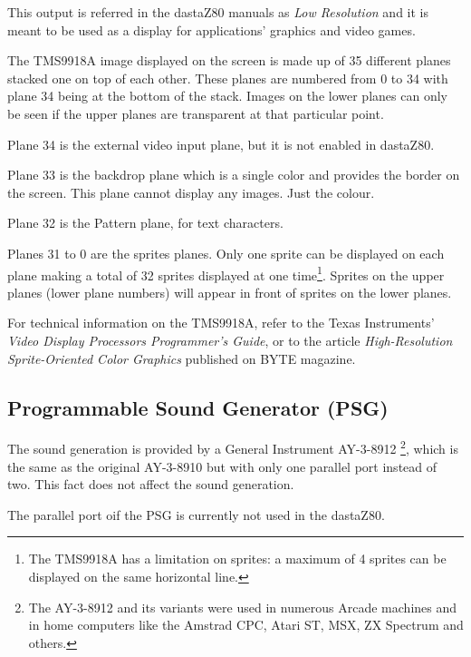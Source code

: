 \documentclass[a4paper,11pt]{article}
\begin{document}
    This output is referred in the dastaZ80 manuals as \textit{Low Resolution}
    and it is meant to be used as a display for applications' graphics and video
    games.

    The TMS9918A image displayed on the screen is made up of 35 different planes
    stacked one on top of each other. These planes are numbered from 0 to 34
    with plane 34 being at the bottom of the stack. Images on the lower planes
    can only be seen if the upper planes are transparent at that particular
    point.

    Plane 34 is the external video input plane, but it is not enabled in dastaZ80.

    Plane 33 is the backdrop plane which is a single color and provides the
    border on the screen. This plane cannot display any images. Just the colour.

    Plane 32 is the Pattern plane, for text characters.

    Planes 31 to 0 are the sprites planes. Only one sprite can be displayed on
    each plane making a total of 32 sprites displayed at one time\footnote{The 
    TMS9918A has a limitation on sprites: a maximum of 4 sprites can be
    displayed on the same horizontal line.}. Sprites on the upper planes (lower
    plane numbers) will appear in front of sprites on the lower planes.

    For technical information on the TMS9918A, refer to the Texas Instruments'
    \textit{Video Display Processors Programmer's Guide}\cite{ti1}, or to the article
    \textit{High-Resolution Sprite-Oriented Color Graphics}\cite{ciarcia2}
    published on BYTE magazine.

    \subsection{Programmable Sound Generator (PSG)}

    The sound generation is provided by a General Instrument AY-3-8912
    \footnote{The AY-3-8912 and its variants were used in numerous Arcade
    machines and in home computers like the Amstrad CPC, Atari ST, MSX, ZX
    Spectrum and others.}, which is the same as the original AY-3-8910 but with
    only one parallel port instead of two. This fact does not affect the
    sound generation.

    The parallel port oif the PSG is currently not used in the dastaZ80.
\end{document}
